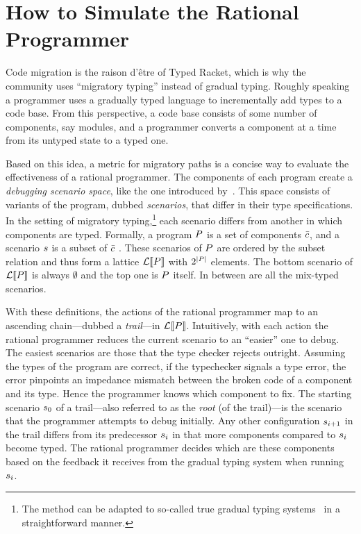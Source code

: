 \section{How to Simulate the Rational Programmer} 

Code migration is the raison d'\^etre of Typed Racket, which is why the community
uses ``migratory typing'' instead of gradual typing. Roughly speaking a
programmer uses a gradually typed language to incrementally add types to a code
base. From this perspective, a code base consists of some number of components,
say modules, and a programmer converts a component at a time from its untyped
state to a typed one. 

Based on this idea, a metric for migratory paths is a concise way to
evaluate the effectiveness of a
rational programmer. The components of each program create a
\emph{debugging scenario
space}, like the one introduced by~\citet{tfgnvf-popl-2016}. This space consists
of variants of the program, dubbed \emph{scenarios}, that differ in their
type specifications. In the setting of migratory typing,\footnote{The method can
be adapted to so-called true gradual typing systems~\cite{svcb-snapl-2015} in a
straightforward manner.} each scenario differs from another in which
components are typed. Formally, a program $P$ is a set of components
$\bar{c}$, and a scenario $s$ is a subset of
$\bar{c}$ . These scenarios of $P$ are ordered by the subset
relation and thus form a lattice $\mathcal{L}\llbracket P\rrbracket$ with $2^{\mid P \mid}$
elements.  The bottom scenario of $\mathcal{L}\llbracket P\rrbracket$ is always $\emptyset$
and the top one is $P$ itself. In between are all the mix-typed
scenarios.

With these definitions, the actions of the rational programmer map to an
ascending chain---dubbed a \emph{trail}---in $\mathcal{L}\llbracket P\rrbracket$. 
Intuitively, with each action the rational programmer  reduces the current
scenario to an ``easier'' one to debug. The easiest scenarios are those
that the type checker rejects outright. Assuming the types of the
program are correct, if the typechecker signals a type error, the error
pinpoints an impedance mismatch between the broken code of a component 
and its type. Hence the programmer knows which component to fix. 
The starting
scenario $s_0$ of a trail---also referred to as the \emph{root} (of the
trail)---is the scenario that the programmer attempts to debug initially. Any other
configuration $s_{i+1}$ in the trail differs from its predecessor
$s_{i}$ in that more 
components compared to  $s_{i}$ become typed. The rational programmer 
decides which are these components based on the feedback it receives from
the gradual typing system when running $s_{i}$.

